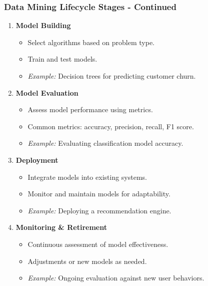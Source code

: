 \documentclass[aspectratio=169]{beamer}
\begin{document}
\begin{frame}[fragile]
    \frametitle{Data Mining Lifecycle Stages - Continued}
    
    \begin{enumerate}[resume]
        \item \textbf{Model Building}
        \begin{itemize}
            \item Select algorithms based on problem type.
            \item Train and test models.
            \item \textit{Example:} Decision trees for predicting customer churn.
        \end{itemize}

        \item \textbf{Model Evaluation}
        \begin{itemize}
            \item Assess model performance using metrics.
            \item Common metrics: accuracy, precision, recall, F1 score.
            \item \textit{Example:} Evaluating classification model accuracy.
        \end{itemize}

        \item \textbf{Deployment}
        \begin{itemize}
            \item Integrate models into existing systems.
            \item Monitor and maintain models for adaptability.
            \item \textit{Example:} Deploying a recommendation engine.
        \end{itemize}

        \item \textbf{Monitoring \& Retirement}
        \begin{itemize}
            \item Continuous assessment of model effectiveness.
            \item Adjustments or new models as needed.
            \item \textit{Example:} Ongoing evaluation against new user behaviors.
        \end{itemize}
    \end{enumerate}
\end{frame}
\end{document}
